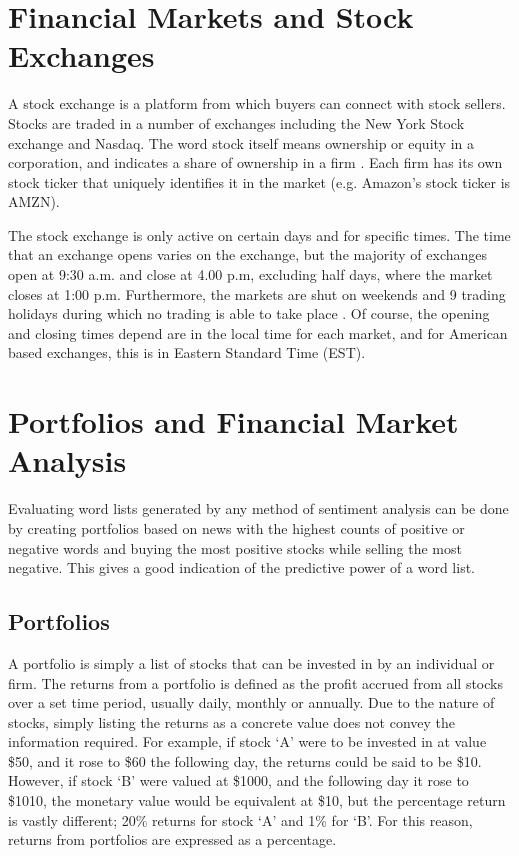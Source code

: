 \section{Financial Markets and Stock Exchanges}
A stock exchange is a platform from which buyers can connect with stock sellers. Stocks are traded in a number of exchanges including the New York Stock exchange and Nasdaq. The word stock itself means ownership or equity in a corporation, and indicates a share of ownership in a firm \cite{stock-market}. Each firm has its own stock ticker that uniquely identifies it in the market (e.g. Amazon's stock ticker is AMZN).

The stock exchange is only active on certain days and for specific times. The time that an exchange opens varies on the exchange, but the majority of exchanges open at 9:30 a.m. and close at 4.00 p.m, excluding half days, where the market closes at 1:00 p.m. Furthermore, the markets are shut on weekends and 9 trading holidays during which no trading is able to take place \cite{stock-opening-hours}. Of course, the opening and closing times depend are in the local time for each market, and for American based exchanges, this is in Eastern Standard Time (EST).


\section{Portfolios and Financial Market Analysis}
Evaluating word lists generated by any method of sentiment analysis can be done by creating portfolios based on news with the highest counts of positive or negative words and buying the most positive stocks while selling the most negative. This gives a good indication of the predictive power of a word list.

\subsection{Portfolios}
A portfolio is simply a list of stocks that can be invested in by an individual or firm. The returns from a portfolio is defined as the profit accrued from all stocks over a set time period, usually daily, monthly or annually. Due to the nature of stocks, simply listing the returns as a concrete value does not convey the information required. For example, if stock `A' were to be invested in at value \$50, and it rose to \$60 the following day, the returns could be said to be \$10. However, if stock `B' were valued at \$1000, and the following day it rose to \$1010, the monetary value would be equivalent at \$10, but the percentage return is vastly different; 20\% returns for stock `A' and 1\% for `B'. For this reason, returns from portfolios are expressed as a percentage.


